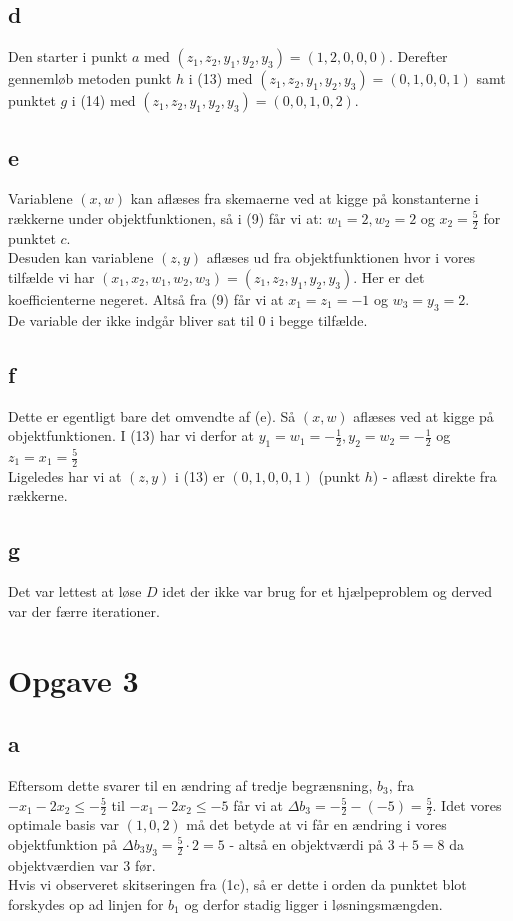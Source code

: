 \documentclass[a4paper]{article}
\begin{document}
\subsection*{d}
Den starter i punkt $a$ med $(z_1,z_2,y_1,y_2,y_3)=(1,2,0,0,0)$. Derefter gennemløb metoden punkt $h$ i (13) med $(z_1,z_2,y_1,y_2,y_3)=(0,1,0,0,1)$ samt punktet $g$ i (14) med $(z_1,z_2,y_1,y_2,y_3)=(0,0,1,0,2)$.

\subsection*{e}
Variablene $(x,w)$ kan aflæses fra skemaerne ved at kigge på konstanterne i rækkerne under objektfunktionen, så i (9) får vi at: $w_1=2,w_2=2$ og $x_2=\frac{5}{2}$ for punktet $c$. \\
Desuden kan variablene $(z,y)$ aflæses ud fra objektfunktionen hvor i vores tilfælde vi har $(x_1,x_2,w_1,w_2,w_3)=(z_1,z_2,y_1,y_2,y_3)$. Her er det koefficienterne negeret. Altså fra (9) får vi at $x_1=z_1=-1$ og $w_3=y_3=2$. \\
De variable der ikke indgår bliver sat til $0$ i begge tilfælde.

\subsection*{f}
Dette er egentligt bare det omvendte af (e). Så $(x,w)$ aflæses ved at kigge på objektfunktionen. I (13) har vi derfor at $y_1=w_1=-\frac{1}{2},y_2=w_2=-\frac{1}{2}$ og $z_1=x_1=\frac{5}{2}$ \\
Ligeledes har vi at $(z,y)$ i (13) er $(0,1,0,0,1)$ (punkt $h$) - aflæst direkte fra rækkerne.

\subsection*{g}
Det var lettest at løse $D$ idet der ikke var brug for et hjælpeproblem og derved var der færre iterationer.

\section*{Opgave 3}
\subsection*{a}
Eftersom dette svarer til en ændring af tredje begrænsning, $b_3$, fra $-x_1-2x_2\leq -\frac{5}{2}$ til $-x_1-2x_2\leq -5$ får vi at $\Delta b_3= -\frac{5}{2}-(-5)=\frac{5}{2}$. Idet vores optimale basis var $(1,0,2)$ må det betyde at vi får en ændring i vores objektfunktion på $\Delta b_3y_3=\frac{5}{2}\cdot 2=5$ - altså en objektværdi på $3+5=8$ da objektværdien var $3$ før.\\
Hvis vi observeret skitseringen fra (1c), så er dette i orden da punktet blot forskydes op ad linjen for $b_1$ og derfor stadig ligger i løsningsmængden.
\end{document}
